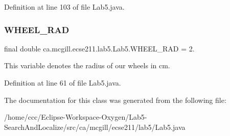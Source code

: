 Definition at line 103 of file Lab5.\+java.

\mbox{\label{classca_1_1mcgill_1_1ecse211_1_1lab5_1_1_lab5_ab9b6fc96d3fb1ac6c7d69d1727b3bbdd}} 
\subsubsection{\texorpdfstring{W\+H\+E\+E\+L\+\_\+\+R\+AD}{WHEEL\_RAD}}
{\footnotesize\ttfamily final double ca.\+mcgill.\+ecse211.\+lab5.\+Lab5.\+W\+H\+E\+E\+L\+\_\+\+R\+AD = 2.\hspace{0.3cm}{\ttfamily [static]}}

This variable denotes the radius of our wheels in cm. 

Definition at line 61 of file Lab5.\+java.



The documentation for this class was generated from the following file\+:\begin{DoxyCompactItemize}
\item 
/home/ccc/\+Eclipse-\/\+Workspace-\/\+Oxygen/\+Lab5-\/\+Search\+And\+Localize/src/ca/mcgill/ecse211/lab5/Lab5.\+java\end{DoxyCompactItemize}
